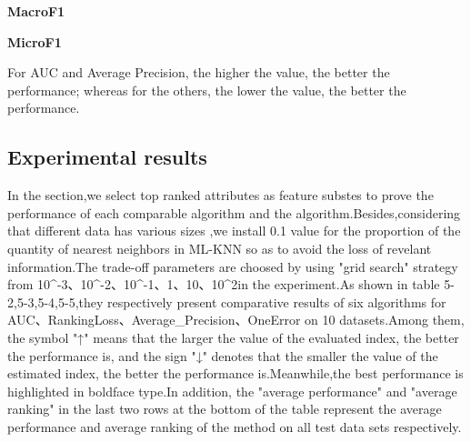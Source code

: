 \documentclass[final,3p,times]{elsarticle}
\begin{document}
\textbf{MacroF1} 


\textbf{MicroF1} 

For AUC and Average Precision, the higher the value, the better the performance; whereas for the others, the lower the value, the better the performance.







\subsection{Experimental results}
In the section,we select top ranked attributes as feature substes to prove the performance of each comparable algorithm and the algorithm.Besides,considering that different data has various sizes ,we install 0.1 value for the proportion of the quantity of nearest neighbors in ML-KNN so as to avoid the loss of revelant information.The trade-off parameters are choosed by using "grid search" strategy from {10^-3、10^-2、10^-1、1、10、10^2}in the experiment.As shown in table 5-2,5-3,5-4,5-5,they respectively present comparative results of six algorithms for AUC、RankingLoss、Average_Precision、OneError on 10 datasets.Among them, the symbol "↑" means that the larger the value of the evaluated index, the better the performance is, and the sign "↓" denotes that the smaller the value of the estimated index, the better the performance is.Meanwhile,the best performance is highlighted in boldface type.In addition, the "average performance" and "average ranking" in the last two rows at the bottom of the table represent the average performance and average ranking of the method on all test data sets respectively.
\end{document}
